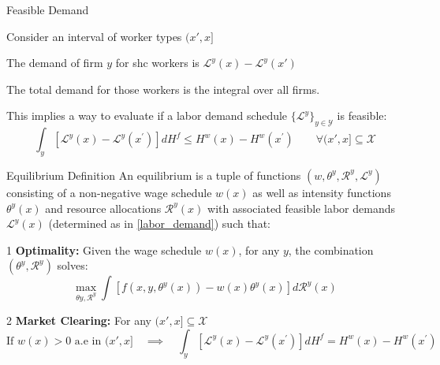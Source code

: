 \documentclass[notes,11pt, aspectratio=169]{beamer}
\newenvironment{wideitemize}{\itemize\addtolength{\itemsep}{10pt}}{\enditemize}
\begin{document}
\begin{frame}{Feasible Demand}
	\begin{wideitemize}
		\item Consider an interval of worker types $(x',x]$
		\item The demand of firm $y$ for shc workers is $\mathcal{L}^y(x) - \mathcal{L}^y(x')$
		\item The total demand for those workers is the integral over all firms.
		\item This implies a way to evaluate if a labor demand schedule $\{\mathcal{L}^y\}_{y\in \mathcal{Y}}$ is feasible:\[\int_{y}\left[\mathcal{L}^{y}(x)-\mathcal{L}^{y}\left(x^{\prime}\right)\right] d H^{f} \leq H^{w}(x)-H^{w}\left(x^{\prime}\right) \qquad \forall  (x',x]\subseteq\mathcal{X}\]
	\end{wideitemize}
\end{frame}

\begin{frame}{Equilibrium Definition}
	An equilibrium is a tuple of functions $\left(w, \theta^{y}, \mathcal{R}^{y}, \mathcal{L}^{y}\right)$ consisting of a non-negative wage schedule $w(x)$ as well as intensity functions $\theta^{y}(x)$ and resource allocations $\mathcal{R}^{y}(x)$ with associated feasible labor demands $\mathcal{L}^{y}(x)$ (determined as in \eqref{labor_demand}) such that:
	\pause
\begin{wideitemize}
    \item[1]\textbf{Optimality:} Given the wage schedule $w(x)$, for any $y$, the combination $\left(\theta^{y}, \mathcal{R}^{y}\right)$ solves:$$\max _{\theta y, \mathcal{R}^{y}} \int\left[f\left(x, y, \theta^{y}(x)\right)-w(x) \theta^{y}(x)\right] d \mathcal{R}^{y}(x)$$
	\item[2] \textbf{Market Clearing:} For any $(x',x]\subseteq\mathcal{X}$
    \[\text{If } w(x)>0 \text{ a.e in } (x', x]  \quad \implies \quad   \int_{y}\left[\mathcal{L}^{y}(x)-\mathcal{L}^{y}\left(x^{\prime}\right)\right] d H^{f} = H^{w}(x)-H^{w}\left(x^{\prime}\right) \]
\end{wideitemize}
\end{frame}
\end{document}
